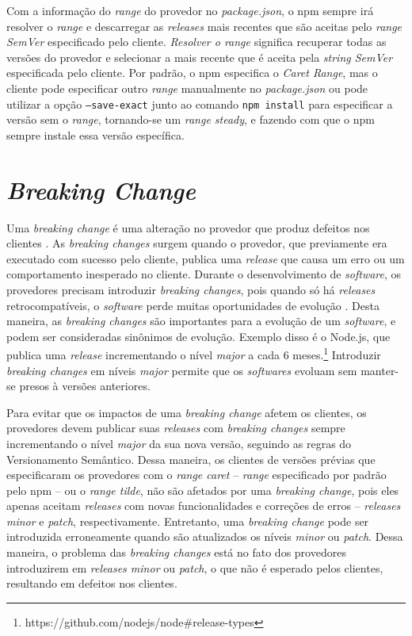 Com a informação do \textit{range} do provedor no \textit{package.json}, o \textsf{npm} sempre irá resolver o \textit{range} e descarregar as \textit{releases} mais recentes que são aceitas pelo \textit{range SemVer} especificado pelo cliente. \textit{Resolver o range} significa recuperar todas as versões do provedor e selecionar a mais recente que é aceita pela \textit{string SemVer} especificada pelo cliente. Por padrão, o \textsf{npm} especifica o \textit{Caret Range}, mas o cliente pode especificar outro \textit{range} manualmente no \textit{package.json} ou pode utilizar a opção \texttt{--save-exact} junto ao comando \texttt{npm install} para especificar a versão sem o \textit{range}, tornando-se um \textit{range steady}, e fazendo com que o \textsf{npm} sempre instale essa versão específica.

\section{\textit{Breaking Change}}
\label{ref-teo:breaking_change}

Uma \textit{breaking change} é uma alteração no provedor que produz defeitos nos clientes \cite{teorical_reference:semver}. As \textit{breaking changes} surgem quando o provedor, que previamente era executado com sucesso pelo cliente, publica uma \textit{release} que causa um erro ou um comportamento inesperado no cliente. Durante o desenvolvimento de \textit{software}, os provedores precisam introduzir \textit{breaking changes}, pois quando só há \textit{releases} retrocompatíveis, o \textit{software} perde muitas oportunidades de evolução \cite{teorical_reference:bc_2}. Desta maneira, as \textit{breaking changes} são importantes para a evolução de um \textit{software}, e podem ser consideradas sinônimos de evolução. Exemplo disso é o \textsf{Node.js}, que publica uma \textit{release} incrementando o nível \textit{major} a cada 6 meses.\footnote{https://github.com/nodejs/node\#release-types} Introduzir \textit{breaking changes} em níveis \textit{major} permite que os \textit{softwares} evoluam sem manter-se presos à versões anteriores.

Para evitar que os impactos de uma \textit{breaking change} afetem os clientes, os provedores devem publicar suas \textit{releases} com \textit{breaking changes} sempre incrementando o nível \textit{major} da sua nova versão, seguindo as regras do Versionamento Semântico. Dessa maneira, os clientes de versões prévias que especificaram os provedores com o \textit{range caret} -- \textit{range} especificado por padrão pelo \textsf{npm} -- ou o \textit{range tilde}, não são afetados por uma \textit{breaking change}, pois eles apenas aceitam \textit{releases} com novas funcionalidades e correções de erros -- \textit{releases minor} e \textit{patch}, respectivamente. Entretanto, uma \textit{breaking change} pode ser introduzida erroneamente quando são atualizados os níveis \textit{minor} ou \textit{patch}. Dessa maneira, o problema das \textit{breaking changes} está no fato dos provedores introduzirem em \textit{releases minor} ou \textit{patch}, o que não é esperado pelos clientes, resultando em defeitos nos clientes.

